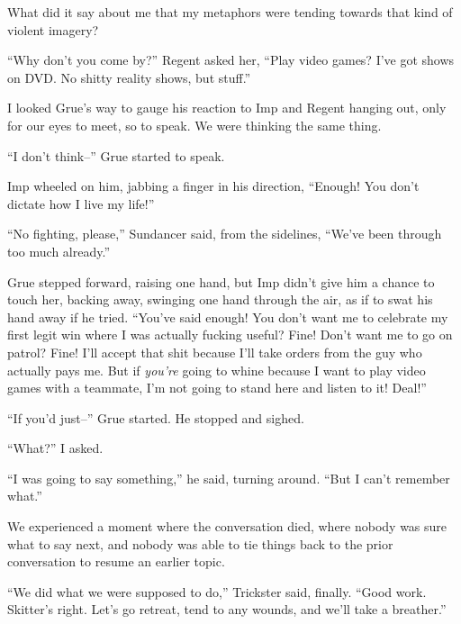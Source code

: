 What did it say about me that my metaphors were tending towards that kind of violent imagery?



``Why don't you come by?'' Regent asked her, ``Play video games?  I've got shows on DVD.  No shitty reality shows, but stuff.''



I looked Grue's way to gauge his reaction to Imp and Regent hanging out, only for our eyes to meet, so to speak.  We were thinking the same thing.



``I don't think--'' Grue started to speak.



Imp wheeled on him, jabbing a finger in his direction, ``Enough!  You don't dictate how I live my life!''



``No fighting, please,'' Sundancer said, from the sidelines, ``We've been through too much already.''



Grue stepped forward, raising one hand, but Imp didn't give him a chance to touch her, backing away, swinging one hand through the air, as if to swat his hand away if he tried.  ``You've said enough!  You don't want me to celebrate my first legit win where I was actually fucking useful?  Fine!  Don't want me to go on patrol?  Fine!  I'll accept that shit because I'll take orders from the guy who actually pays me.  But if \emph{you're} going to whine because I want to play video games with a teammate, I'm not going to stand here and listen to it!  Deal!''



``If you'd just--'' Grue started.  He stopped and sighed.



``What?'' I asked.



``I was going to say something,'' he said, turning around.  ``But I can't remember what.''



We experienced a moment where the conversation died, where nobody was sure what to say next, and nobody was able to tie things back to the prior conversation to resume an earlier topic.



``We did what we were supposed to do,'' Trickster said, finally.  ``Good work.  Skitter's right.  Let's go retreat, tend to any wounds, and we'll take a breather.''



